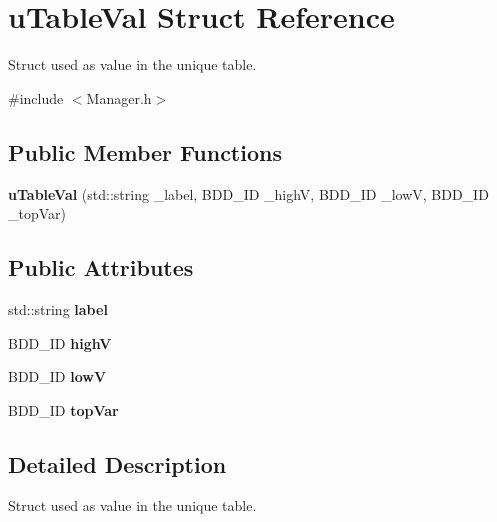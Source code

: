 \hypertarget{structuTableVal}{}\section{u\+Table\+Val Struct Reference}
\label{structuTableVal}


Struct used as value in the unique table.  




{\ttfamily \#include $<$Manager.\+h$>$}

\subsection*{Public Member Functions}
\begin{DoxyCompactItemize}
\item 
\mbox{\label{structuTableVal_ab9e2d6edb764f8af1a62aa5cb444add7}} 
{\bfseries u\+Table\+Val} (std\+::string \+\_\+label, B\+D\+D\+\_\+\+ID \+\_\+highV, B\+D\+D\+\_\+\+ID \+\_\+lowV, B\+D\+D\+\_\+\+ID \+\_\+top\+Var)
\end{DoxyCompactItemize}
\subsection*{Public Attributes}
\begin{DoxyCompactItemize}
\item 
\mbox{\label{structuTableVal_a8ca46d4291571e5cd1569ac5ba701e4e}} 
std\+::string {\bfseries label}
\item 
\mbox{\label{structuTableVal_a1c3fd8079ba33a453d1762beca95ef20}} 
B\+D\+D\+\_\+\+ID {\bfseries highV}
\item 
\mbox{\label{structuTableVal_a1e2a6c0f68891ac712879852616b6d8e}} 
B\+D\+D\+\_\+\+ID {\bfseries lowV}
\item 
\mbox{\label{structuTableVal_a578c807b8e9b93694e72da62c0af888c}} 
B\+D\+D\+\_\+\+ID {\bfseries top\+Var}
\end{DoxyCompactItemize}


\subsection{Detailed Description}
Struct used as value in the unique table. 

